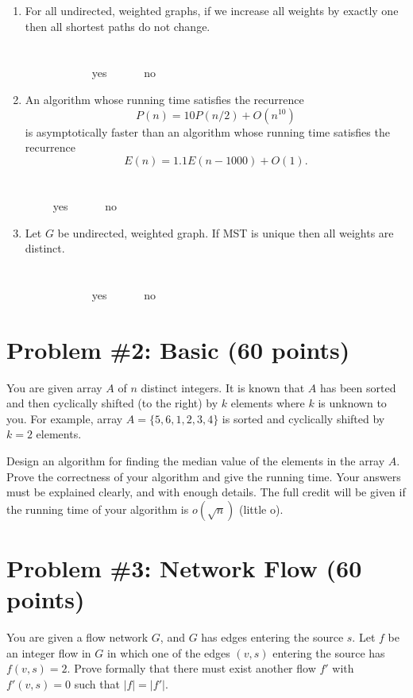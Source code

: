 \documentclass[letterpaper, 11pt]{article}
\begin{document}
\begin{enumerate}
\item For all undirected, weighted graphs, if we increase all weights by exactly one then all shortest paths do not change. \\ \\ \\ \ \ \ \ \ \ \  \ \ \ \ \ yes \ \  \ \ \ \ no       \\

\item  An algorithm whose running time satisfies the recurrence $$P(n) = 10 P(n/2) + O(n^{10})$$
is asymptotically faster than an algorithm whose running time satisfies the recurrence $$E(n) = 1.1 E(n -	 1000) + O(1).$$
\\ \\  \ \ \ \ \ yes \ \  \ \ \ \ no       \\
\item Let $G$ be undirected, weighted graph. If MST is unique then all weights are distinct. \\ \\ \\ \ \ \ \ \ \ \  \ \ \ \ \ yes \ \  \ \ \ \ no       \\
\end{enumerate}

\newpage

\section{Problem \#2: \textbf{Basic} (60 points)}
You are given array $A$ of $n$ distinct integers. It is known that $A$ has been sorted and then cyclically shifted (to the right)
by $k$ elements where $k$ is unknown to you.
For example, array $A = \{5,6,1,2,3,4\}$ is sorted and cyclically shifted by $k=2$ elements.

Design an algorithm for finding the median value of the elements in the array $A$. Prove the correctness of your algorithm and give the running time.
Your answers must be explained clearly, and with enough details.
The full credit will be given if the running time of your algorithm is $o(\sqrt{n})$ (little o).

\newpage





\section{Problem \#3: \textbf{Network Flow} (60 points)}
You are given a flow network $G$, and $G$ has edges entering the source $s$. Let $f$ be an integer flow in $G$ in which one of the edges $(v,s)$ entering the source has $f(v,s)=2$. Prove formally that there must exist another flow $f'$ with $f'(v,s)=0$ such that $|f|=|f'|$.
\end{document}
